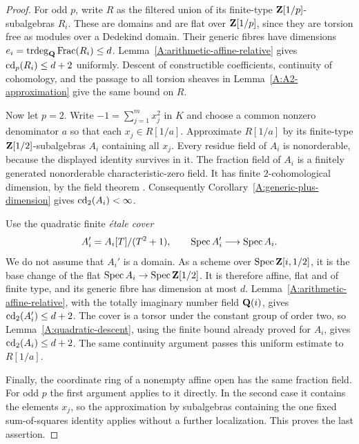 \begin{proof}
For odd $p$, write $R$ as the filtered union of its finite-type
$\mathbf Z[1/p]$-subalgebras $R_i$. These are domains and are flat over
$\mathbf Z[1/p]$, since they are torsion free as modules over a
Dedekind domain. Their generic fibres have dimensions
$e_i=\operatorname{trdeg}_{\mathbf Q}\operatorname{Frac}(R_i)\leq d$.
Lemma~\ref{A:arithmetic-affine-relative} gives
$\operatorname{cd}_p(R_i)\leq d+2$ uniformly. Descent of constructible
coefficients, continuity of cohomology, and the passage to all
torsion sheaves in Lemma~\ref{A:A2-approximation} give the same
bound on $R$.

Now let $p=2$. Write $-1=\sum_{j=1}^m x_j^2$ in $K$ and
choose a common nonzero denominator $a$ so that each
$x_j\in R[1/a]$. Approximate $R[1/a]$ by its finite-type
$\mathbf Z[1/2]$-subalgebras $A_i$ containing all $x_j$.
Every residue field of $A_i$ is nonorderable, because the displayed
identity survives in it. The fraction field of $A_i$ is a
finitely generated nonorderable characteristic-zero field. It has
finite $2$-cohomological dimension, by the field theorem
\citep[Expos\'e X, Theorem 2.1]{A_SGA4}. Consequently
Corollary~\ref{A:generic-plus-dimension} gives
$\operatorname{cd}_2(A_i)<\infty$.

Use the quadratic finite \emph{\'etale cover}
\[
 A_i'=A_i[T]/(T^2+1),\qquad
 \operatorname{Spec} A_i'\longrightarrow\operatorname{Spec} A_i.
\]
We do not assume that $A_i'$ is a domain. As a scheme over
$\operatorname{Spec}\mathbf Z[i,1/2]$, it is the base change of the flat
$\operatorname{Spec} A_i\to\operatorname{Spec}\mathbf Z[1/2]$. It is therefore affine, flat
and of finite type, and its generic fibre has dimension at most
$d$. Lemma~\ref{A:arithmetic-affine-relative}, with the totally
imaginary number field $\mathbf Q(i)$, gives $\operatorname{cd}_2(A_i')\leq d+2$.
The cover is a torsor under the constant group of order two, so
Lemma~\ref{A:quadratic-descent}, using the finite bound already
proved for $A_i$, gives $\operatorname{cd}_2(A_i)\leq d+2$.
The same continuity argument passes this uniform estimate to
$R[1/a]$.

Finally, the coordinate ring of a nonempty affine open has the
same fraction field. For odd $p$ the first argument applies to it
directly. In the second case it contains the elements $x_j$, so
the approximation by subalgebras containing the one fixed
sum-of-squares identity applies without a further localization.
This proves the last assertion.
\end{proof}

